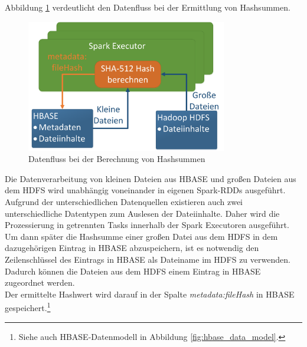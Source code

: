 \noindent
Abbildung \ref{fig:data_processing_hashes} verdeutlicht den Datenfluss bei der Ermittlung von Hashsummen.
\begin{figure}[ht]
  \centering
  \includegraphics[width=0.78\textwidth]{./resource/spark_processing_hashes.png}
  \caption{Datenfluss bei der Berechnung von Hashsummen}
  \label{fig:data_processing_hashes}
\end{figure}

\noindent
Die Datenverarbeitung von kleinen Dateien aus HBASE und großen Dateien aus dem HDFS wird unabhängig voneinander in eigenen Spark-RDDs ausgeführt. Aufgrund der unterschiedlichen Datenquellen existieren auch zwei unterschiedliche Datentypen zum Auslesen der Dateiinhalte. Daher wird die Prozessierung in getrennten Tasks innerhalb der Spark Executoren ausgeführt. Um dann später die Hashsumme einer großen Datei aus dem HDFS in dem dazugehörigen Eintrag in HBASE abzuspeichern, ist es notwendig den Zeilenschlüssel des Eintrags in HBASE als Dateiname im HDFS zu verwenden. Dadurch können die Dateien aus dem HDFS einem Eintrag in HBASE zugeordnet werden.\\
Der ermittelte Hashwert wird darauf in der Spalte \textit{metadata:fileHash} in HBASE  gespeichert.\footnote{Siehe auch HBASE-Datenmodell in Abbildung \ref{fig:hbase_data_model}.}

